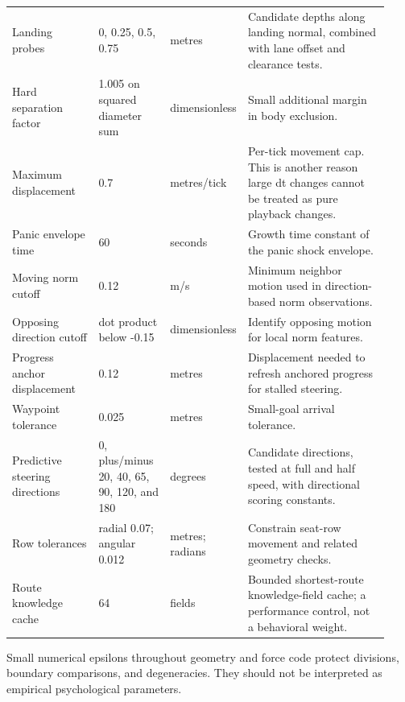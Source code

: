 \documentclass[11pt]{article}
\begin{document}
{\begin{longtable}{@{}p{0.23\linewidth}p{0.19\linewidth}p{0.13\linewidth}p{0.38\linewidth}@{}}
Landing probes & 0, 0.25, 0.5, 0.75 & metres & Candidate depths along landing normal, combined with lane offset and clearance tests. \\

Hard separation factor & 1.005 on squared diameter sum & dimensionless & Small additional margin in body exclusion. \\

Maximum displacement & 0.7 & metres/tick & Per-tick movement cap. This is another reason large dt changes cannot be treated as pure playback changes. \\

Panic envelope time & 60 & seconds & Growth time constant of the panic shock envelope. \\

Moving norm cutoff & 0.12 & m/s & Minimum neighbor motion used in direction-based norm observations. \\

Opposing direction cutoff & dot product below -0.15 & dimensionless & Identify opposing motion for local norm features. \\

Progress anchor displacement & 0.12 & metres & Displacement needed to refresh anchored progress for stalled steering. \\

Waypoint tolerance & 0.025 & metres & Small-goal arrival tolerance. \\

Predictive steering directions & 0, plus/minus 20, 40, 65, 90, 120, and 180 & degrees & Candidate directions, tested at full and half speed, with directional scoring constants. \\

Row tolerances & radial 0.07; angular 0.012 & metres; radians & Constrain seat-row movement and related geometry checks. \\

Route knowledge cache & 64 & fields & Bounded shortest-route knowledge-field cache; a performance control, not a behavioral weight. \\

\end{longtable}

}

Small numerical epsilons throughout geometry and force code protect divisions, boundary comparisons, and degeneracies. They should not be interpreted as empirical psychological parameters.
\end{document}
